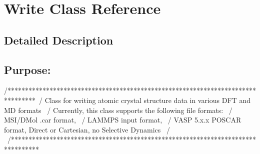 \hypertarget{class_write}{}\section{Write Class Reference}
\label{class_write}


\subsection{Detailed Description}
\subsection*{{\bfseries Purpose\+:} }

\begin{DoxyVerb}/********************************************************************************\
/  Class for writing atomic crystal structure data in various DFT and MD formats \
/  Currently, this class supports the following file formats:                    \
/          MSI/DMol .car format,                                                 \
/          LAMMPS input format,                                                  \
/          VASP 5.x.x POSCAR format, Direct or Cartesian, no Selective Dynamics  \
/                                                                                \
/********************************************************************************\
\end{DoxyVerb}



